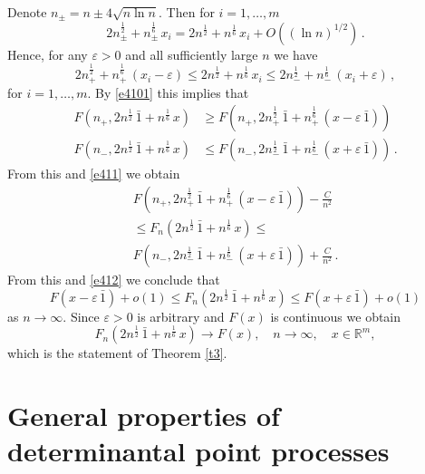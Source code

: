 \documentclass[12pt]{amsart}
\newcommand{\R}{\mathbb{R}}
\newcommand{\bo}{\bar 1}
\theoremstyle{plain}
\theoremstyle{definition}
\numberwithin{equation}{section}
\begin{document}
 Denote $n_\pm=n\pm 4\sqrt{n\ln n}$. Then for $i=1,\dots,m$
%
\begin{equation*}
2n^\frac12_\pm +n^\frac16_\pm\, x_i =2n^\frac12  +n^{\frac 16}\, x_i +O((\ln n)^{1/2}) \,.
\end{equation*}
%
Hence, for any $\varepsilon>0$ and all sufficiently large $n$ we have 
%
\begin{equation*}
 2n^\frac12_+ +n_+^{\frac 16} \, (x_i-\varepsilon)
\le
2n^\frac12 +n^{\frac 16}\, x_i 
\le 2n^\frac12_- +n_-^{\frac 16} \, (x_i+\varepsilon) \,,
\end{equation*}
% 
for $i=1,\dots,m$. By \eqref{e4101} this implies that 
%
\begin{align*}
F\left(n_+,2n^\frac12\,\bo+n^{\frac 16}\, x\right)&\ge 
F\left(n_+,2n^\frac12_+\, \bo+n_+^{\frac 16} \, \left(x-\varepsilon\, \bo\right)\right)\\
F\left(n_-,2n^\frac12\,\bo+n^{\frac 16}\, x\right)&\le 
F\left(n_-,2n^\frac12_-\, \bo+n_-^{\frac 16} \, \left(x+\varepsilon\, \bo\right)\right) \,. 
\end{align*} 
%
{}From this and \eqref{e411}  we obtain
%
\begin{multline*}
F\left(n_+,2n^\frac12_+\, \bo+n_+^{\frac 16} \, \left(x-\varepsilon\, \bo\right)\right)-\frac C{n^2}\\ \le 
F_n\left(2n^\frac12\,\bo+n^{\frac 16}\, x \right)\le \\  
F\left(n_-,2n^\frac12_-\, \bo+n_-^{\frac 16} \,\left(x+\varepsilon\, \bo\right)\right)+\frac C{n^2} \,. 
\end{multline*} 
%
{}From this and  \eqref{e412} we conclude that 
%
\begin{equation*}
F\left(x-\varepsilon\,\bo\right)+o(1)\le F_n\left(2n^\frac12\,\bo+n^{\frac 16}\, x \right)\le 
F\left(x+\varepsilon\, \bo\right)+o(1)
\end{equation*}
%
as $n\to\infty$. Since $\varepsilon>0$ is arbitrary and $F(x)$ is continuous 
we obtain
%
\begin{equation*}
F_n \left(2n^\frac12\,\bo+n^{\frac 16}\, x \right)\to F(x),\quad n\to \infty, \quad x\in \R^m,
\end{equation*}
%
which is the statement of Theorem \ref{t3}. 

\appendix 

\section{General properties of determinantal point processes}\label{s5}
\end{document}
